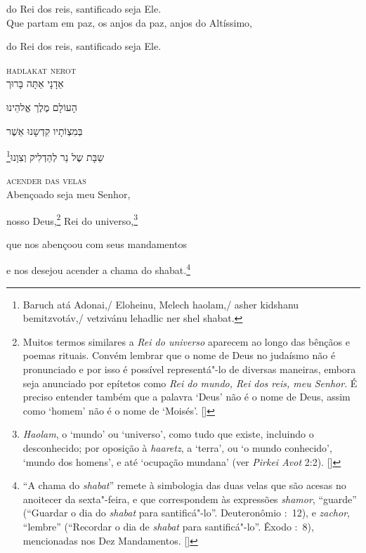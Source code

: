 do Rei dos reis, santificado seja Ele.\\[10pt]

Que partam em paz, os anjos da paz, anjos do Altíssimo,

do Rei dos reis, santificado seja Ele.

\movetoevenpage
\raggedleft




\vspace*{1cm}

\textsc{hadlakat nerot}\\[15pt]

אַדָנָי אַתָּה בָּרוּך

הָעוֹלָם מֶלֶך אֱלהֵינוּ

בְּמִצְוֹתָיו קִדְשָנוּ אַשֶׁר

\footnote{Baruch atá Adonai,/ Eloheinu, Melech haolam,/ asher kidshanu bemitzvotáv,/ vetzivánu lehadlic ner shel shabat.}שַבָּת שֶל נֵר לְהַדְלִיק וְצִוָנוּ‏

\movetooddpage
\raggedright

\vspace*{1cm}

\textsc{acender das velas}\\[15pt]

Abençoado seja meu Senhor,

nosso Deus,\footnote{
		Muitos termos similares a \textit{Rei do universo} aparecem
		ao longo das bênçãos e poemas rituais. Convém lembrar que o nome de Deus
		no judaísmo não é pronunciado e por isso é possível
		representá"-lo de diversas maneiras, embora seja anunciado por
		epítetos como \textit{Rei do mundo, Rei dos reis, meu Senhor}.
		É preciso entender também que a palavra `Deus' não é o nome de
		Deus, assim como `homem' não é o nome de `Moisés'. []} 
Rei do universo,\footnote{\textit{Haolam}, o `mundo' ou `universo', como tudo
		que existe, incluindo o desconhecido; por oposição à \textit{haaretz},
		a `terra', ou `o mundo conhecido', `mundo dos homens', e até `ocupação
		mundana' (ver \textit{Pirkei Avot} 2:2). []}

que nos abençoou com seus mandamentos

e nos desejou acender a chama do shabat.\footnote{``A chama do \textit{shabat}'' remete à simbologia das duas velas
	que são acesas no anoitecer da sexta"-feira, e que correspondem às
	expressões \emph{shamor}, ``guarde'' (``Guardar o dia do
	\emph{shabat} para santificá"-lo''. Deuteronômio :~12),
	e \emph{zachor}, ``lembre''
	(``Recordar o dia de \emph{shabat} para santificá"-lo''. Êxodo
	:~8), mencionadas nos Dez Mandamentos. []}

